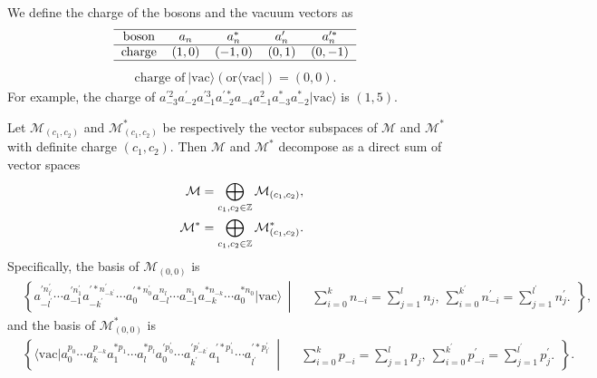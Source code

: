 \documentclass[11pt,reqno]{amsart}
\numberwithin{equation}{section}
\begin{document}
We define the charge of the bosons and the vacuum vectors as
\begin{eqnarray}
\centering
\begin{tabular}{c c c c c}
\hline
boson & $a_{n}$ & $a_{n}^{*}$ & $a^{\prime}_{n}$ & $a_{n}^{\prime\ast}$ \\
\hline
charge  & $(1,0)$  & $(-1,0)$   & $(0,1)$  & $(0,-1)$  \\
\hline
\end{tabular}
\end{eqnarray}
\begin{eqnarray}
\text{charge of}\ |\text{vac}\rangle(\text{or}\langle\text{vac}|)=(0,0).
\end{eqnarray}
For example, the charge of $a^{\prime2}_{-3}a^{\prime}_{-2}a^{\prime3}_{-1}a^{\prime\ast}_{-2}a_{-4}a^{2}_{-1}
a^{\ast}_{-3}a^{\ast}_{-2}|\text{vac}\rangle$ is $(1,5)$.

Let $\mathcal{M}_{(c_{1},c_{2})}$ and $\mathcal{M}^{\ast}_{(c_{1},c_{2})}$ be respectively the vector subspaces of $\mathcal{M}$ and $\mathcal{M}^{\ast}$ with definite charge $(c_{1},c_{2})$. Then $\mathcal{M}$ and $\mathcal{M}^{\ast}$ decompose as  a direct sum of vector spaces
\begin{eqnarray}
&&\mathcal{M}=\bigoplus\limits_{c_{1},c_{2}\in\mathbb{Z}}\mathcal{M}_{(c_{1},c_{2})},\notag\\
&&\mathcal{M}^{\ast}=\bigoplus\limits_{c_{1},c_{2}\in\mathbb{Z}}\mathcal{M}^{\ast}
_{(c_{1},c_{2})}.
\end{eqnarray}
Specifically, the basis of $\mathcal{M}_{(0,0)}$ is
\begin{align}
&\left\{a_{-l^{\prime}}^{\prime n^{\prime}_{l^{\prime}}}
\cdots a^{\prime n^{\prime}_{1}}_{-1}a^{\prime\ast n^{\prime}_{-k^{\prime}}}_{-k^{\prime}}
\cdots a^{\prime\ast n^{\prime}_{0}}_{0}a_{-l}^{n_{l}}\cdots a_{-1}^{n_{1}}
a^{\ast n_{-k}}_{-k}\cdots a^{\ast n_{0}}_{0}|\text{vac}\rangle\,\middle|\, %
    \begin{aligned}
        & \sum\limits_{i=0}^{k}n_{-i}=\sum\limits_{j=1}^{l}n_{j}, \ \sum\limits_{i=0}^{k^{\prime}}n^{\prime}_{-i}=\sum\limits_{j=1}^{l^{\prime}}n^{\prime}_{j}.
    \end{aligned}\right\},
\end{align}
and the basis of $\mathcal{M}^{\ast}_{(0,0)}$ is
\begin{align}
&\left\{\langle\text{vac}|a^{p_{0}}_{0}\cdots a^{p_{-k}}_{k}
a^{\ast p_{1}}_{1}\cdots a^{\ast p_{l}}_{l}a^{\prime p^{\prime}_{0}}_{0}
\cdots a^{\prime p^{\prime}_{-k^{\prime}}}_{k^{\prime}} a^{\prime\ast p^{\prime}_{1}}_{1}
\cdots a^{\prime\ast p^{\prime}_{l^{\prime}}}_{l^{\prime}}\,\middle|\, %
    \begin{aligned}
        & \sum\limits_{i=0}^{k}p_{-i}=\sum\limits_{j=1}^{l}p_{j},\ \sum\limits_{i=0}^{k^{\prime}}p^{\prime}_{-i}=\sum\limits_{j=1}^{l^{\prime}}p^{\prime}_{j}.
         \end{aligned}\right\}.
\end{align}
\end{document}
